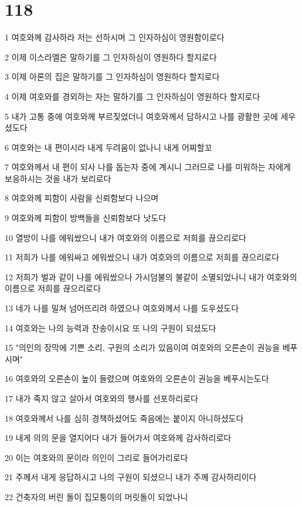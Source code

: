 \chapter{118}

\par 1 여호와께 감사하라 저는 선하시며 그 인자하심이 영원함이로다
\par 2 이제 이스라엘은 말하기를 그 인자하심이 영원하다 할지로다
\par 3 이제 아론의 집은 말하기를 그 인자하심이 영원하다 할지로다
\par 4 이제 여호와를 경외하는 자는 말하기를 그 인자하심이 영원하다 할지로다
\par 5 내가 고통 중에 여호와께 부르짖었더니 여호와께서 답하시고 나를 광활한 곳에 세우셨도다
\par 6 여호와는 내 편이시라 내게 두려움이 없나니 내게 어찌할꼬
\par 7 여호와께서 내 편이 되사 나를 돕는자 중에 계시니 그러므로 나를 미워하는 자에게 보응하시는 것을 내가 보리로다
\par 8 여호와께 피함이 사람을 신뢰함보다 나으며
\par 9 여호와께 피함이 방백들을 신뢰함보다 낫도다
\par 10 열방이 나를 에워쌌으니 내가 여호와의 이름으로 저희를 끊으리로다
\par 11 저희가 나를 에워싸고 에워쌌으니 내가 여호와의 이름으로 저희를 끊으리로다
\par 12 저희가 벌과 같이 나를 에워쌌으나 가시덤불의 불같이 소멸되었나니 내가 여호와의 이름으로 저희를 끊으리로다
\par 13 네가 나를 밀쳐 넘어뜨리려 하였으나 여호와께서 나를 도우셨도다
\par 14 여호와는 나의 능력과 찬송이시요 또 나의 구원이 되셨도다
\par 15 "의인의 장막에 기쁜 소리, 구원의 소리가 있음이여 여호와의 오른손이 권능을 베푸시며"
\par 16 여호와의 오른손이 높이 들렸으며 여호와의 오른손이 권능을 베푸시는도다
\par 17 내가 죽지 않고 살아서 여호와의 행사를 선포하리로다
\par 18 여호와께서 나를 심히 경책하셨어도 죽음에는 붙이지 아니하셨도다
\par 19 내게 의의 문을 열지어다 내가 들어가서 여호와께 감사하리로다
\par 20 이는 여호와의 문이라 의인이 그리로 들어가리로다
\par 21 주께서 내게 응답하시고 나의 구원이 되셨으니 내가 주께 감사하리이다
\par 22 건축자의 버린 돌이 집모퉁이의 머릿돌이 되었나니
